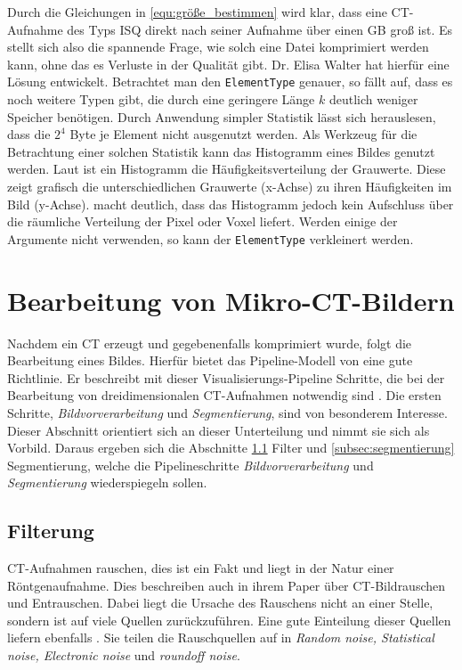 Durch die Gleichungen in \ref{equ:größe_bestimmen} wird klar, dass eine \ac{CT}-Aufnahme
des Typs \ac{ISQ} direkt nach seiner Aufnahme über einen \ac{GB} groß ist. Es
stellt sich also die spannende Frage, wie solch eine Datei komprimiert werden kann,
ohne das es Verluste in der Qualität gibt. Dr. Elisa Walter hat hierfür eine
Lösung entwickelt. Betrachtet man den \texttt{ElementType} genauer, so fällt auf,
dass es noch weitere Typen gibt, die durch eine geringere Länge $k$ deutlich weniger
Speicher benötigen. Durch Anwendung simpler Statistik lässt sich herauslesen, dass
die $2^{4}$ Byte je Element nicht ausgenutzt werden. Als Werkzeug für die
Betrachtung einer solchen Statistik kann das Histogramm eines Bildes genutzt
werden. Laut \citet[S.~249]{jahne2024} ist ein Histogramm die
Häufigkeitsverteilung der Grauwerte. Diese zeigt grafisch die unterschiedlichen Grauwerte
(x-Achse) zu ihren Häufigkeiten im Bild (y-Achse). \citet[S.~249]{jahne2024} macht
deutlich, dass das Histogramm jedoch kein Aufschluss über die räumliche
Verteilung der Pixel oder Voxel liefert. Werden einige der Argumente nicht verwenden,
so kann der \texttt{ElementType} verkleinert werden.

\section{Bearbeitung von Mikro-CT-Bildern}
\label{sec:bildbearbeitung} Nachdem ein \ac{CT} erzeugt und gegebenenfalls
komprimiert wurde, folgt die Bearbeitung eines Bildes. Hierfür bietet das
Pipeline-Modell von \citet[S.~50]{handels2000} eine gute Richtlinie. Er
beschreibt mit dieser Visualisierungs-Pipeline Schritte, die bei der Bearbeitung
von dreidimensionalen \ac{CT}-Aufnahmen notwendig sind \citep[vgl.][S.~50]{handels2000}.
Die ersten Schritte, \textit{Bildvorverarbeitung} und \textit{Segmentierung},
sind von besonderem Interesse. Dieser Abschnitt orientiert sich an dieser Unterteilung
und nimmt sie sich als Vorbild. Daraus ergeben sich die Abschnitte
\ref{subsec:filter} Filter und \ref{subsec:segmentierung} Segmentierung, welche die
Pipelineschritte \textit{Bildvorverarbeitung} und \textit{Segmentierung} wiederspiegeln
sollen.

\subsection{Filterung}
\label{subsec:filter} \ac{CT}-Aufnahmen rauschen, dies ist ein Fakt und liegt in
der Natur einer Röntgenaufnahme. Dies beschreiben auch \citet[K.~3]{diwakar2018}
in ihrem Paper über \ac{CT}-Bildrauschen und Entrauschen. Dabei liegt die Ursache
des Rauschens nicht an einer Stelle, sondern ist auf viele Quellen
zurückzuführen. Eine gute Einteilung dieser Quellen liefern ebenfalls \citet[K.~3]{diwakar2018}.
Sie teilen die Rauschquellen auf in \textit{Random noise, Statistical noise,
Electronic noise} und \textit{roundoff noise}.

